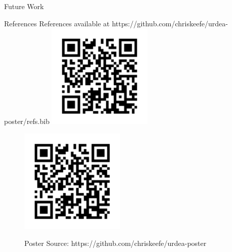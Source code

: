 \documentclass[final]{beamer}
\newlength{\sepwidth}
\newlength{\colwidth}
\newcommand{\separatorcolumn}{\begin{column}{\sepwidth}\end{column}}
\begin{document}
\begin{frame}[t]
\begin{columns}[t]
\begin{column}{\colwidth}
\begin{block}{Future Work}
  \end{block}

  \begin{block}{References}
    References available at https://github.com/chriskeefe/urdea-poster/refs.bib
    \includegraphics[height=5cm]{assets/repo}

  \end{block}

  \begin{figure}
    \begin{minipage}[c]{\textwidth}
      \hfill
      \includegraphics[height=5cm]{assets/repo}
    \end{minipage}
    \begin{minipage}[c]{\textwidth}
      \hfill
      Poster Source: https://github.com/chriskeefe/urdea-poster
    \end{minipage}
\end{figure}


\end{column}

\separatorcolumn
\end{columns}
\end{frame}
\end{document}
